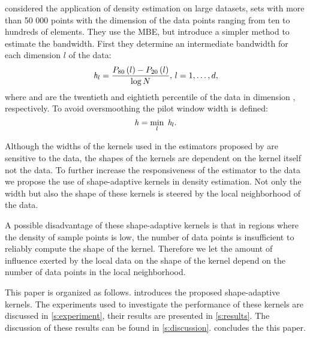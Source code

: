 	\textcite{ferdosi2011comparison} considered the application of density estimation on large datasets, \ie sets with more than 50 000 points with the dimension of the data points ranging from ten to hundreds of elements. They use the MBE, but introduce a simpler method to estimate the bandwidth. First they determine an intermediate bandwidth for each dimension $l$ of the data:
		\begin{equation}\label{eq:1:ferdosiGeneralBandwidth}
			\mathit{h}_{l} = \frac{P_{80}\left( l \right) - P_{20}\left( l \right)}{\log N}, \, l = 1, \dotsc, d,
		\end{equation}
	where  and  are the twentieth and eightieth percentile of the data in dimension \itDim, respectively. 
	To avoid oversmoothing the pilot window width is defined:
	\begin{equation*}
	 	\mathit{h} = \min_{l} \; \mathit{h}_{l}.
	 \end{equation*}

	Although the widths of the kernels used in the estimators proposed by \citeauthor{breiman1977variable,wilkinson1995dataplot} are sensitive to the data, the shapes of the kernels are dependent on the kernel itself not the data. To further increase the responsiveness of the estimator to the data we propose the use of shape-adaptive kernels in density estimation. Not only the width but also the shape of these kernels is steered by the local neighborhood of the data.

	A possible disadvantage of these shape-adaptive kernels is that in regions where the density of sample points is low, the number of data points is insufficient to reliably compute the shape of the kernel. Therefore we let the amount of influence exerted by the local data on the shape of the kernel depend on the number of data points in the local neighborhood.

	This paper is organized as follows.  introduces the proposed shape-adaptive kernels. The experiments used to investigate the performance of these kernels are discussed in \cref{s:experiment}, their results are presented in \cref{s:results}. The discussion of these results can be found in \cref{s:discussion}.  concludes the this paper. 